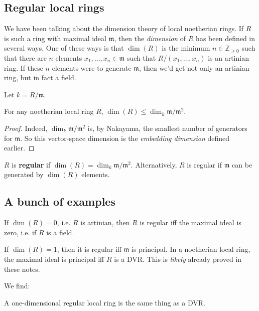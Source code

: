\subsection{Regular local rings}

We have been talking about the dimension theory of local noetherian rings. If
$R$ is such a ring with maximal ideal $\mathfrak{m}$, then the \emph{dimension}
of $R$ has been defined in several ways. One of these ways is that 
$\dim (R)$ is the minimum $n \in \mathbb{Z}_{\geq 0}$ such that there are $n$
elements $x_1, \dots, x_n \in \mathfrak{m}$ such that $R/(x_1, \dots, x_n)$ is
an artinian ring. If these $n$ elements were to generate $\mathfrak{m}$, then
we'd get not only an artinian ring, but in fact a field. 

Let $k = R/\mathfrak{m}$.
\begin{proposition} For any noetherian local ring $R$,
$\dim(R) \leq \dim_{k} \mathfrak{m}/\mathfrak{m}^2$.
\end{proposition} 
\begin{proof} 
Indeed, $\dim_k \mathfrak{m}/\mathfrak{m}^2$ is, by Nakayama, the smallest
number of generators for $\mathfrak{m}$. So this vector-space dimension is the
\emph{embedding dimension} defined earlier.
\end{proof} 

\begin{definition} 
$R$ is \textbf{regular} if $\dim(R) = \dim_k \mathfrak{m}/\mathfrak{m}^2$.
Alternatively, $R$ is regular if $\mathfrak{m}$ can be generated by $\dim(R)$
elements.
\end{definition} 

\subsection{A bunch of examples}
\begin{example} 
If $\dim(R)=0$, i.e. $R$ is artinian, then $R$ is regular iff the maximal ideal
is zero, i.e. if $R$ is a field.
\end{example} 

\begin{example} 
If $\dim(R) =1$, then it is regular iff $\mathfrak{m}$ is principal. In a
noetherian local ring, the maximal ideal is principal iff $R$ is a DVR.
This is \emph{likely} already proved in these notes. 
\end{example} 
We find:
\begin{proposition} 
A one-dimensional regular local ring is the same thing as a DVR.
\end{proposition} 

